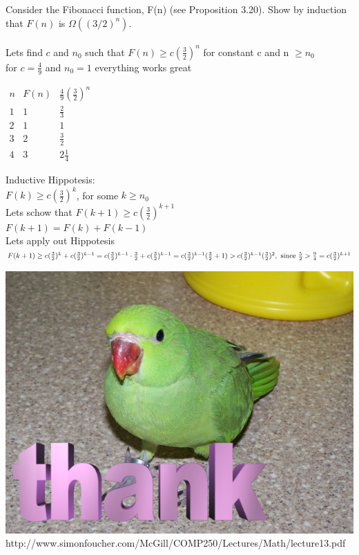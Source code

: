 \documentclass{article}
\begin{document}
Consider the Fibonacci function, F(n) (see Proposition 3.20). Show by
induction that $F(n)$ is $\Omega((3/2)^n)$.\\\\

Lets find $c$ and $n_{0}$ such that $F(n) \geq c(\frac{3}{2})^{n}$ for constant c and n $\geq n_0$\\
for $c = \frac{4}{9}$ and $n_{0} = 1$ everything works great\\
\begin{center}
	$
	\begin{array}{ccc}
	n	& F(n) & \frac{4}{9} (\frac{3}{2})^n \\ 
	1	& 1 & \frac{2}{3} \\ 
	2	& 1 & 1 \\ 
	3	& 2 & \frac{3}{2} \\
	4	& 3 & 2\frac{1}{4}
	\end{array} 
	$
\end{center}
Inductive Hippotesis:\\
$F(k) \geq c(\frac{3}{2})^{k}$, for some $k \geq n_0$\\
Lets schow that $F(k+1) \geq c(\frac{3}{2})^{k+1}$\\

$F(k+1) = F(k) + F(k-1)$\\
Lets apply out Hippotesis\\
\begin{math}
F(k+1) \geq c(\frac{3}{2})^{k} + c(\frac{3}{2})^{k-1}\\
= c(\frac{3}{2})^{k-1}\cdot\frac{3}{2} + c(\frac{3}{2})^{k-1}\\
= c(\frac{3}{2})^{k-1}(\frac{3}{2}+1)\\
> c(\frac{3}{2})^{k-1}(\frac{3}{2})^{2}, \textnormal{ since } \frac{5}{2} > \frac{9}{4} \\
= c(\frac{3}{2})^{k+1}
\end{math}

\begin{center}
	\includegraphics[scale=0.3]{birb}
	http://www.simonfoucher.com/McGill/COMP250/Lectures/Math/lecture13.pdf
\end{center}

	
\end{document}
